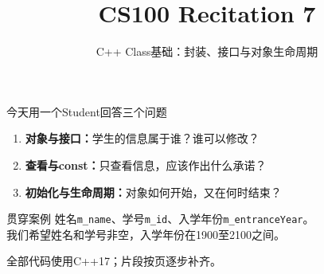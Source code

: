 \documentclass[red,tutorial,sectionpages,shtu]{vsp-beamer}
\title{CS100 Recitation 7}
\subtitle{C++ Class基础：封装、接口与对象生命周期}
\begin{document}
    \VSPtitleframe
    \begin{frame}{今天用一个Student回答三个问题}
        \begin{enumerate}
            \item \textbf{对象与接口：}学生的信息属于谁？谁可以修改？
            \item \textbf{查看与const：}只查看信息，应该作出什么承诺？
            \item \textbf{初始化与生命周期：}对象如何开始，又在何时结束？
        \end{enumerate}
        \medskip
        \begin{vspquotered}{贯穿案例}
            姓名\texttt{m\_name}、学号\texttt{m\_id}、入学年份\texttt{m\_entranceYear}。\\
            我们希望姓名和学号非空，入学年份在1900至2100之间。
        \end{vspquotered}
        \medskip
        全部代码使用C++17；片段按页逐步补齐。
    \end{frame}
    
    
    
    \VSPendframe{}
\end{document}
